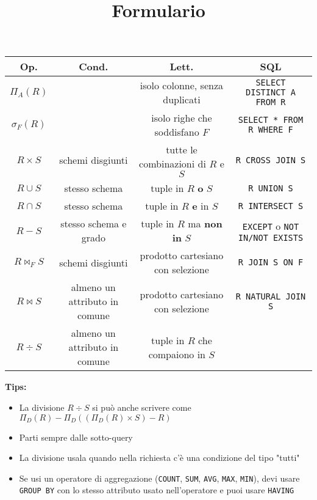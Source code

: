 \documentclass[10pt]{article}
\title{Formulario}
\date{}
\begin{document}
\maketitle
\begin{table}[h]
    \centering
    \begin{tabular}{|c|c|c|c|}
        \hline
        \textbf{Op.} & \textbf{Cond.} & \textbf{Lett.} & \textbf{SQL}\\
        \hline
        $\Pi_{A}(R)$ &  & isolo colonne, senza duplicati & \texttt{SELECT DISTINCT A FROM R}\\
        $\sigma_{F}(R)$ &  & isolo righe che soddisfano $F$ & \texttt{SELECT * FROM R WHERE F}\\
        $R \times S$ & schemi disgiunti & tutte le combinazioni di $R$ e $S$ & \texttt{R CROSS JOIN S}\\
        $R \cup S$ & stesso schema & tuple in $R$ \textbf{o} $S$ & \texttt{R UNION S}\\
        $R \cap S$ & stesso schema & tuple in $R$ \textbf{e} in $S$ & \texttt{R INTERSECT S}\\
        $R - S$ & stesso schema e grado & tuple in $R$ ma \textbf{non in} $S$ & \texttt{EXCEPT} o \texttt{NOT IN/NOT EXISTS}\\
        $R \bowtie_{F} S$ & schemi disgiunti & prodotto cartesiano con selezione & \texttt{R JOIN S ON F}\\
        $R \bowtie S$ & almeno un attributo in comune & prodotto cartesiano con selezione & \texttt{R NATURAL JOIN S}\\
        $R \div S$ & almeno un attributo in comune & tuple in $R$ che compaiono in $S$ & \\
        \hline
    \end{tabular}
\end{table}
\textbf{Tips:}
\begin{itemize}
    \item La divisione $R \div S$ si può anche scrivere come $\Pi_{D}(R) - \Pi_{D}((\Pi_{D}(R)\times S)-R)$
    \item Parti sempre dalle sotto-query
    \item La divisione usala quando nella richiesta c'è una condizione del tipo "tutti"
    \item Se usi un operatore di aggregazione (\texttt{COUNT}, \texttt{SUM}, \texttt{AVG}, \texttt{MAX}, \texttt{MIN}), devi usare \texttt{GROUP BY} con lo stesso attributo usato nell'operatore e puoi usare \texttt{HAVING}
\end{itemize}
\end{document}
